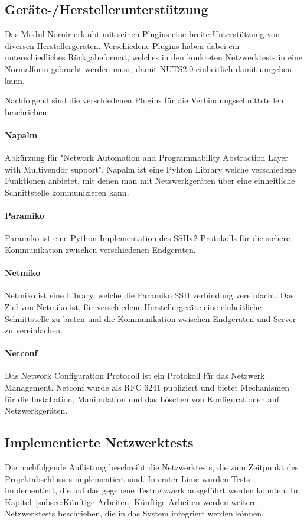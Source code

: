 \documentclass[]{subfiles}
\begin{document}
\subsection{Geräte-/Herstellerunterstützung}
Das Modul Nornir erlaubt mit seinen Plugins eine breite Unterstützung von diversen 
Herstellergeräten. 
Verschiedene Plugins haben dabei ein unterschiedliches Rückgabeformat, welches 
in den konkreten Netzwerktests in eine Normalform gebracht werden muss, damit 
NUTS2.0 einheitlich damit umgehen kann.

Nachfolgend sind die verschiedenen Plugins für die Verbindungsschnittstellen beschrieben:

\paragraph{Napalm}
Abkürzung für "Network Automation and Programmability Abstraction Layer with Multivendor support".
Napalm ist eine Pyhton Library welche verschiedene Funktionen anbietet, mit denen man 
mit Netzwerkgeräten über eine einheitliche Schnittstelle kommunizieren kann.

\paragraph{Paramiko}
Paramiko ist eine Python-Implementation des SSHv2 Protokolls für die sichere Kommunikation
zwischen verschiedenen Endgeräten.

\paragraph{Netmiko}
Netmiko ist eine Library, welche die Paramiko SSH verbindung vereinfacht. 
Das Ziel von Netmiko ist, für verschiedene Herstellergeräte eine einheitliche Schnittstelle
zu bieten und die Kommunikation zwischen Endgeräten und Server zu vereinfachen.

\paragraph{Netconf}
Das Network Configuration Protocoll ist ein Protokoll für das Netzwerk Management.
Netconf wurde als RFC 6241 publiziert und bietet Mechanismen für die Installation,
Manipulation und das Löschen von Konfigurationen auf Netzwerkgeräten.

\newpage

\subsection{Implementierte Netzwerktests}
Die nachfolgende Auflistung beschreibt die Netzwerktests, die zum Zeitpunkt des Projektabschlusses
implementiert sind.
In erster Linie wurden Tests implementiert, die auf das gegebene Testnetzwerk ausgeführt werden
konnten.
Im Kapitel~\ref{subsec:Künftige Arbeiten}-Künftige Arbeiten werden weitere Netzwerktests beschrieben,
die in das System integriert werden können.
\end{document}
